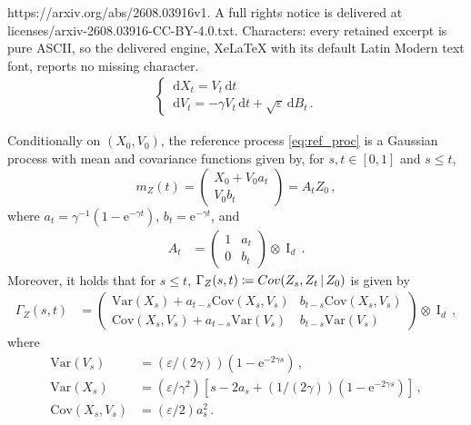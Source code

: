 \documentclass[10pt,a4paper]{amsart}
\newcommand*{\defeq}{\coloneqq}
\newcommand{\Idd}{\operatorname{I}_d}
\newcommand{\ccint}[1]{\left[#1\right]}
\newcommand{\dd}{\,\mathrm{d}}
\newcommand{\eps}{\varepsilon}
\newcommand{\rme}{\mathrm{e}}
\begin{document}
https://arxiv.org/abs/2608.03916v1. A full rights notice is delivered at licenses/arxiv-2608.03916-CC-BY-4.0.txt. Characters: every retained excerpt is pure ASCII, so the delivered engine, XeLaTeX with its default Latin Modern text font, reports no missing character.
\begin{align}\label{eq:ref_proc}
    \begin{cases}
        \dd X_t = V_t\dd t \\
        \dd V_t = -\gamma V_t \dd t + \sqrt{\varepsilon} \dd B_t\,.
    \end{cases}
\end{align}

\begin{lemma}\label{lem:fund}
  Conditionally on $(X_0,V_0)$, the reference process \eqref{eq:ref_proc} is a Gaussian process
  with mean and covariance functions given by, for $s,t \in \ccint{0,1}$ and $s \leq t$,
  \begin{equation*}
    m_Z(t) = \begin{pmatrix}
X_0 + V_0  a_t \\[6pt]
V_0 b_t
\end{pmatrix}  =  A_t Z_0 \,,
    \end{equation*}
where $a_t = \gamma^{-1}(1-\rme^{-\gamma t})$, $b_t = \rme^{-\gamma t}$, and
\begin{align*}
    {A}_t &= \begin{pmatrix}
        1 & a_t \\
        0 & b_t
      \end{pmatrix} \otimes \Idd \,.
\end{align*}
Moreover, it holds that for $s\leq t$, $\Gamma_Z(s,t) \defeq {\rm Cov}(Z_s,Z_t\,|\,Z_0)$ is given by
\begin{align*}
     \Gamma_Z(s,t) &=
     \begin{pmatrix}
\mathrm{Var}(X_s) + a_{t-s}\mathrm{Cov}(X_s,V_s)  & b_{t-s} \mathrm{Cov}(X_s,V_s)  \\
\mathrm{Cov}(X_s,V_s) + a_{t-s}  \mathrm{Var}(V_s)   & b_{t-s}  \mathrm{Var}(V_s)
     \end{pmatrix}
\otimes \Idd \,,
\end{align*}
where
\begin{align*}
    \mathrm{Var}(V_s) &= (\eps /(2 \gamma))( 1  - \rme^{-2 \gamma s} )\,, \\
    \mathrm{Var}(X_s)& =   (\varepsilon/\gamma^2) \left[ s - 2 a_s + (1/(2\gamma))(1-\rme^{-2\gamma s})\right]\,, \\
  \mathrm{Cov}(X_s,V_s) &  =  (\eps/2)a_s^2\,.

\end{align*}
\end{lemma}
\end{document}
